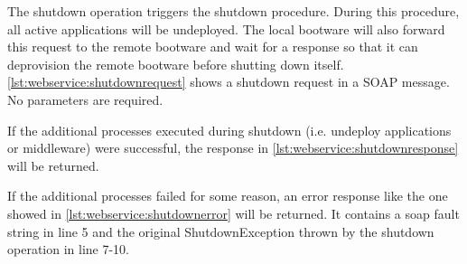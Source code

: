 The shutdown operation triggers the shutdown procedure.
During this procedure, all active applications will be undeployed.
The local bootware will also forward this request to the remote bootware and wait for a response so that it can deprovision the remote bootware before shutting down itself.
\autoref{lst:webservice:shutdownrequest} shows a shutdown request in a SOAP message.
No parameters are required.

\vspace*{\baselineskip}

If the additional processes executed during shutdown (i.e. undeploy applications or middleware) were successful, the response in \autoref{lst:webservice:shutdownresponse} will be returned.

\vspace*{\baselineskip}

If the additional processes failed for some reason, an error response like the one showed in \autoref{lst:webservice:shutdownerror} will be returned.
It contains a soap fault string in line 5 and the original ShutdownException thrown by the shutdown operation in line 7-10.

\vspace*{\baselineskip}
